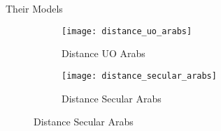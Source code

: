 \documentclass{beamer}
\begin{document}
\begin{frame}{Their Models}
	\begin{figure}[htbp]
		\begin{mdframed}[
			skipabove=0.5\baselineskip, %
			skipbelow=0.5\baselineskip, %
			linewidth=1pt, %
			innerleftmargin=10pt, %
			innerrightmargin=10pt, %
			innertopmargin=10pt, %
			innerbottommargin=10pt, %
			]
			\centering
			\caption{Social Distance by Group}
			\label{fig:Social Distance by Group}
			\begin{subfigure}[b]{0.4\textwidth} %
				\texttt{[image: distance\_uo\_arabs]}
				\caption{Distance UO Arabs}
				\label{fig:distance_uo_arabs}
			\end{subfigure}
			\hfill
			\begin{subfigure}[b]{0.4\textwidth} %
				\texttt{[image: distance\_secular\_arabs]}
				\caption{Distance Secular Arabs}
				\label{fig:distance_secular_arabs}
			\end{subfigure}
		\end{mdframed}
	\end{figure}
	
	
\end{frame}
\end{document}
